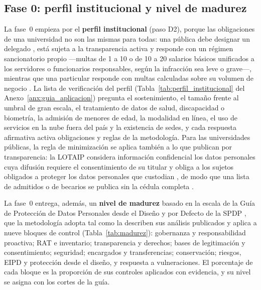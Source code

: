 \subsection{Fase 0: perfil institucional y nivel de madurez}
\label{sec:fase0_madurez}

La fase~0 empieza por el \textbf{perfil institucional} (paso D2), porque las obligaciones de una universidad no son las mismas para todas: una pública debe designar un delegado \cite[art.~48, num.~1]{lopdp2021}, está sujeta a la transparencia activa \cite[arts.~8, lit.~g, y 19]{lotaip2023} y responde con un régimen sancionatorio propio ---multas de 1 a 10 o de 10 a 20 salarios básicos unificados a los servidores o funcionarios responsables, según la infracción sea leve o grave---, mientras que una particular responde con multas calculadas sobre su volumen de negocio \cite[arts.~71 y 72]{lopdp2021}. La lista de verificación del perfil (Tabla~\ref{tab:perfil_institucional} del Anexo~\ref{anx:guia_aplicacion}) pregunta el sostenimiento, el tamaño frente al umbral de gran escala, el tratamiento de datos de salud, discapacidad o biometría, la admisión de menores de edad, la modalidad en línea, el uso de servicios en la nube fuera del país y la existencia de sedes, y cada respuesta afirmativa activa obligaciones y reglas de la metodología. Para las universidades públicas, la regla de minimización se aplica también a lo que publican por transparencia: la LOTAIP considera información confidencial los datos personales cuya difusión requiere el consentimiento de su titular y obliga a los sujetos obligados a proteger los datos personales que custodian \cite[arts.~4, num.~5, y 9]{lotaip2023}, de modo que una lista de admitidos o de becarios se publica sin la cédula completa \cite[art.~10, lit.~e]{lopdp2021}.

La fase~0 entrega, además, un \textbf{nivel de madurez} basado en la escala de la Guía de Protección de Datos Personales desde el Diseño y por Defecto de la SPDP \cite{spdp2025diseno}, que la metodología adopta tal como la describen sus análisis publicados \cite{avl2025diseno,tzvs2025diseno} y aplica a nueve bloques de control (Tabla~\ref{tab:madurez}): gobernanza y responsabilidad proactiva; RAT e inventario; transparencia y derechos; bases de legitimación y consentimiento; seguridad; encargados y transferencias; conservación; riesgos, EIPD y protección desde el diseño, y respuesta a vulneraciones. El porcentaje de cada bloque es la proporción de sus controles aplicados con evidencia, y su nivel se asigna con los cortes de la guía.


